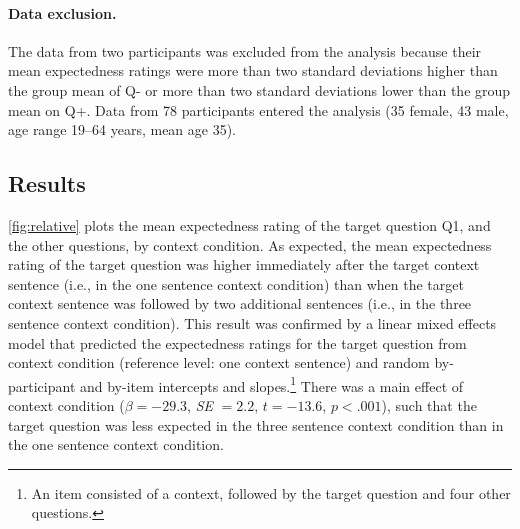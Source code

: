 \documentclass{salt}
\begin{document}
\paragraph{Data exclusion.}

The data from two participants was excluded from the analysis because their mean expectedness ratings were more than two standard deviations higher than the group mean of Q- or more than two standard deviations lower than the group mean on Q+. Data from 78 participants entered the analysis (35 female, 43 male, age range 19--64 years, mean age 35).

\subsection{Results}

\autoref{fig:relative} plots the mean expectedness rating of the target question Q1, and the other questions, by context condition. As expected, the mean expectedness rating of the target question was higher immediately after the target context sentence (i.e., in the one sentence context condition) than when the target context sentence was followed by two additional sentences (i.e., in the three sentence context condition). This result was confirmed by a linear mixed effects model that predicted the expectedness ratings for the target question from context condition (reference level: one context sentence) and random by-participant and by-item intercepts and slopes.\footnote{An item consisted of a context, followed by the target question and four other questions.} There was a main effect of context condition 
 ($\beta=-29.3$, \textit{SE} $=2.2$, $t=-13.6$, $p<.001$), such that the target question was less expected in the three sentence context condition than in the one sentence context condition.
 
\end{document}

